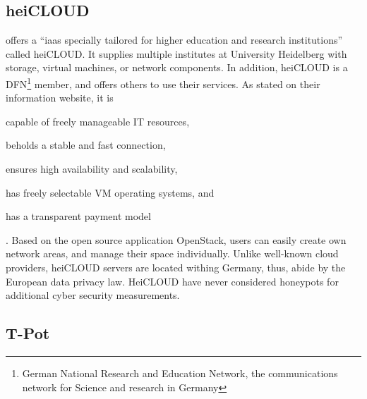 \subsection{heiCLOUD}
\label{subsec:heicloud}

\citet{urz2021} offers a \enquote{\ac{iaas} specially tailored for higher education and research institutions} called heiCLOUD.
It supplies multiple institutes at University Heidelberg with storage, virtual machines, or network components.
In addition, heiCLOUD is a DFN\footnote{German National Research and Education Network,  the communications network for Science and research in Germany} member, and offers others to use their services.
As stated on their information website\cite{heicloud2021}, it is
\begin{enumerate*}[label=(\roman*)]
    \item capable of freely manageable IT resources,
    \item beholds a stable and fast connection,
    \item ensures high availability and scalability,
    \item has freely selectable VM operating systems, and
    \item has a transparent payment model
\end{enumerate*} \cite{heicloud2021}.
Based on the open source application OpenStack, users can easily create own network areas, and manage their space individually.
Unlike well-known cloud providers, heiCLOUD servers are located withing Germany, thus, abide by the European data privacy law.
HeiCLOUD have never considered honeypots for additional cyber security measurements.

\subsection{T-Pot}
\label{subsec:tpot}

